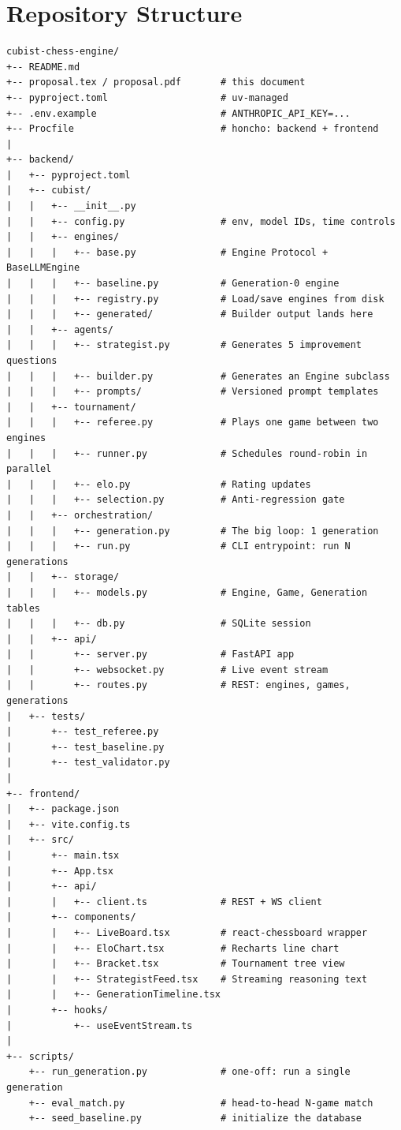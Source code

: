\documentclass[11pt]{article}
\begin{document}
\section{Repository Structure}

\begin{lstlisting}
cubist-chess-engine/
+-- README.md
+-- proposal.tex / proposal.pdf       # this document
+-- pyproject.toml                    # uv-managed
+-- .env.example                      # ANTHROPIC_API_KEY=...
+-- Procfile                          # honcho: backend + frontend
|
+-- backend/
|   +-- pyproject.toml
|   +-- cubist/
|   |   +-- __init__.py
|   |   +-- config.py                 # env, model IDs, time controls
|   |   +-- engines/
|   |   |   +-- base.py               # Engine Protocol + BaseLLMEngine
|   |   |   +-- baseline.py           # Generation-0 engine
|   |   |   +-- registry.py           # Load/save engines from disk
|   |   |   +-- generated/            # Builder output lands here
|   |   +-- agents/
|   |   |   +-- strategist.py         # Generates 5 improvement questions
|   |   |   +-- builder.py            # Generates an Engine subclass
|   |   |   +-- prompts/              # Versioned prompt templates
|   |   +-- tournament/
|   |   |   +-- referee.py            # Plays one game between two engines
|   |   |   +-- runner.py             # Schedules round-robin in parallel
|   |   |   +-- elo.py                # Rating updates
|   |   |   +-- selection.py          # Anti-regression gate
|   |   +-- orchestration/
|   |   |   +-- generation.py         # The big loop: 1 generation
|   |   |   +-- run.py                # CLI entrypoint: run N generations
|   |   +-- storage/
|   |   |   +-- models.py             # Engine, Game, Generation tables
|   |   |   +-- db.py                 # SQLite session
|   |   +-- api/
|   |       +-- server.py             # FastAPI app
|   |       +-- websocket.py          # Live event stream
|   |       +-- routes.py             # REST: engines, games, generations
|   +-- tests/
|       +-- test_referee.py
|       +-- test_baseline.py
|       +-- test_validator.py
|
+-- frontend/
|   +-- package.json
|   +-- vite.config.ts
|   +-- src/
|       +-- main.tsx
|       +-- App.tsx
|       +-- api/
|       |   +-- client.ts             # REST + WS client
|       +-- components/
|       |   +-- LiveBoard.tsx         # react-chessboard wrapper
|       |   +-- EloChart.tsx          # Recharts line chart
|       |   +-- Bracket.tsx           # Tournament tree view
|       |   +-- StrategistFeed.tsx    # Streaming reasoning text
|       |   +-- GenerationTimeline.tsx
|       +-- hooks/
|           +-- useEventStream.ts
|
+-- scripts/
    +-- run_generation.py             # one-off: run a single generation
    +-- eval_match.py                 # head-to-head N-game match
    +-- seed_baseline.py              # initialize the database
\end{lstlisting}
\end{document}
